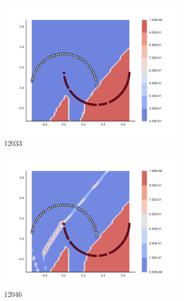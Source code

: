 \begin{figure}[h]
\begin{subfigure}[b]{0.09\textwidth}
    \includegraphics[clip, trim=2.35cm 1.75cm 4.5cm 0cm,width=\textwidth]{img/convergence/12033.pdf}
    \caption{12033}
    \label{fig:convergence_12033}
\end{subfigure}
%
\begin{subfigure}[b]{0.09\textwidth}
    \includegraphics[clip, trim=2.35cm 1.75cm 4.5cm 0cm,width=\textwidth]{img/convergence/12046.pdf}
    \caption{12046}
    \label{fig:convergence_12046}
\end{subfigure}
%
\begin{subfigure}[b]{0.09\textwidth}

\end{subfigure}
\end{figure}
